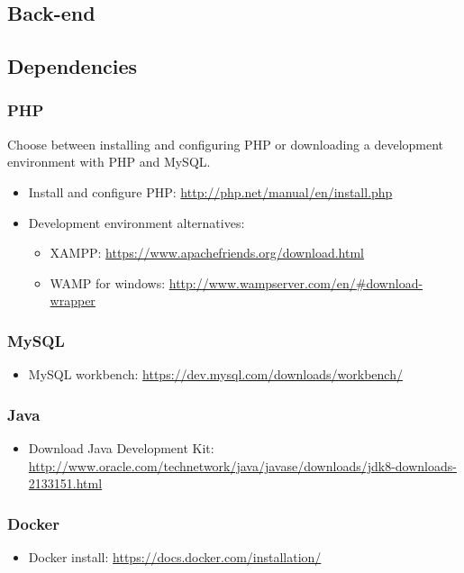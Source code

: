 \begin{appendices}
\section{Back-end}

\subsection{Dependencies}

\subsubsection{PHP}

Choose between installing and configuring PHP or downloading a development environment with PHP and MySQL.
\begin{itemize}
	\item Install and configure PHP: \url{http://php.net/manual/en/install.php}
	\item Development environment alternatives:
	\begin{itemize}
		\item XAMPP: \url{https://www.apachefriends.org/download.html}
		\item WAMP for windows: \url{http://www.wampserver.com/en/#download-wrapper}
	\end{itemize}
\end{itemize}
	
\subsubsection{MySQL}
\begin{itemize}
	\item MySQL workbench: \url{https://dev.mysql.com/downloads/workbench/}
\end{itemize}
		
\subsubsection{Java}
\begin{itemize}
	\item Download Java Development Kit: \url{http://www.oracle.com/technetwork/java/javase/downloads/jdk8-downloads-2133151.html}
\end{itemize}
			
\subsubsection{Docker}
\begin{itemize}
	\item Docker install: \url{https://docs.docker.com/installation/}
\end{itemize}
				

\end{appendices}
